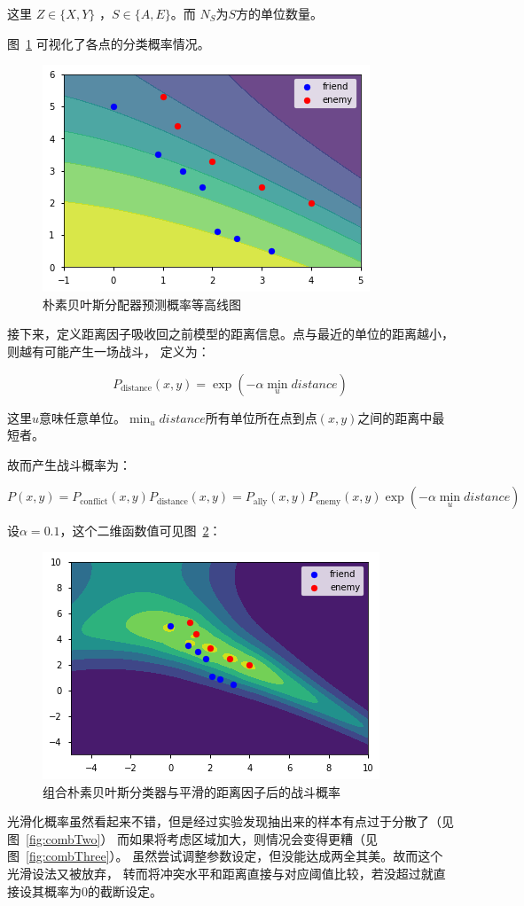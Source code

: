 \documentclass{article}
\begin{document}
这里 $Z \in \{ X,Y \}$ ，$S \in \{ A,E \}$。而 $N_S$为$S$方的单位数量。

图~\ref{fig:naivebayes} 可视化了各点的分类概率情况。

\begin{figure}[ht]
\includegraphics[width=0.6\linewidth]{naivebayes.png}
\caption{朴素贝叶斯分配器预测概率等高线图}
\label{fig:naivebayes}
\end{figure}


接下来，定义距离因子吸收回之前模型的距离信息。点与最近的单位的距离越小，则越有可能产生一场战斗，
定义为：

$$
P_{\text{distance}}(x,y) = \exp(-\alpha \min_{u} distance)
$$


这里$u$意味任意单位。$\min_u distance$所有单位所在点到点$(x,y)$之间的距离中最短者。

故而产生战斗概率为：

$$
P(x,y) = P_{\text{conflict}}(x,y) P_{\text{distance}}(x,y) = 
P_\text{ally}(x,y) P_\text{enemy}(x,y) \exp(-\alpha \min_{u} distance)
$$


设$\alpha=0.1$，这个二维函数值可见图~\ref{fig:combOne}：

\begin{figure}[ht]
\includegraphics[width=0.6\linewidth]{comb1.png}
\caption{
组合朴素贝叶斯分类器与平滑的距离因子后的战斗概率}
\label{fig:combOne}
\end{figure}


光滑化概率虽然看起来不错，但是经过实验发现抽出来的样本有点过于分散了（见图~\ref{fig:combTwo}）
而如果将考虑区域加大，则情况会变得更糟（见图~\ref{fig:combThree}）。
虽然尝试调整参数设定，但没能达成两全其美。故而这个光滑设法又被放弃，
转而将冲突水平和距离直接与对应阈值比较，若没超过就直接设其概率为0的截断设定。
\end{document}
